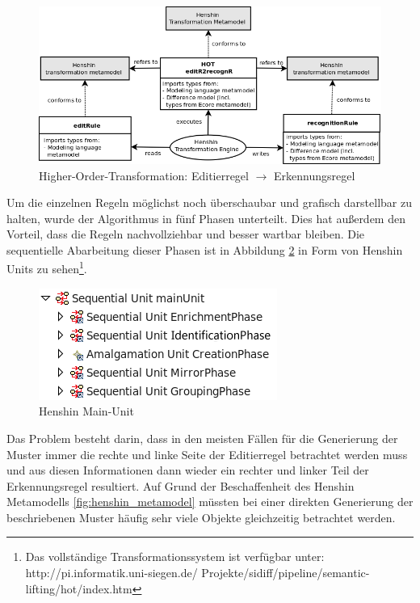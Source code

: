 \begin{figure}[htb]
  \centering
  \includegraphics[width=1.0\textwidth]{images/hot_overview.png}
  \caption{Higher-Order-Transformation: Editierregel $\to$ Erkennungsregel}
  \label{fig:hot}
\end{figure}

Um die einzelnen Regeln möglichst noch überschaubar und grafisch darstellbar zu halten, wurde der
Algorithmus in fünf Phasen unterteilt. Dies hat außerdem den Vorteil, dass die Regeln
nachvollziehbar und besser wartbar bleiben. Die sequentielle Abarbeitung dieser Phasen ist in
Abbildung \ref{fig:hot_main_unit} in Form von Henshin Units zu
sehen\footnote{\parbox[t]{\linewidth}{Das vollständige Transformationssystem ist verfügbar unter:
http://pi.informatik.uni-siegen.de/ Projekte/sidiff/pipeline/semantic-lifting/hot/index.htm}}.

\begin{figure}[h!]
  \centering
  \includegraphics[scale=0.8]{images/hot_main_unit.png}
  \caption{Henshin Main-Unit}
  \label{fig:hot_main_unit}
\end{figure}

Das Problem besteht darin, dass in den meisten Fällen für die Generierung der Muster immer die
rechte und linke Seite der Editierregel betrachtet werden muss und aus diesen Informationen dann
wieder ein rechter und linker Teil der Erkennungsregel resultiert. Auf Grund der Beschaffenheit des
Henshin Metamodells \ref{fig:henshin_metamodel} müssten bei einer direkten Generierung der
beschriebenen Muster häufig sehr viele Objekte gleichzeitig betrachtet werden.

